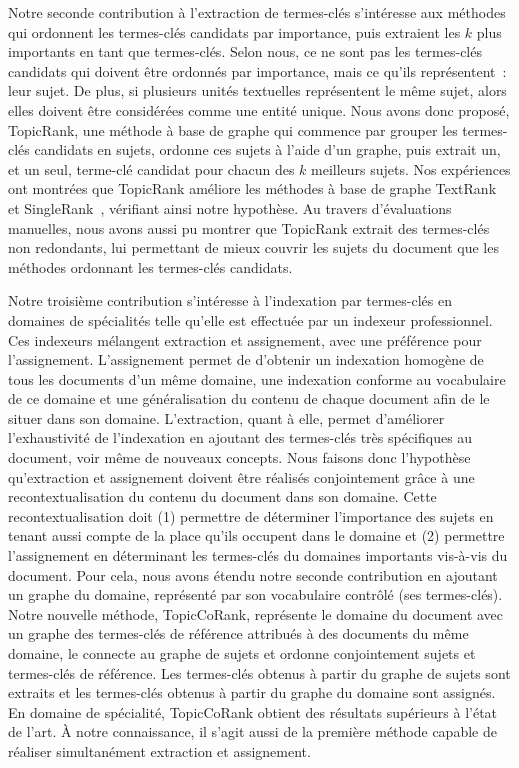     Notre seconde contribution à l'extraction de termes-clés s'intéresse aux
    méthodes qui ordonnent les termes-clés candidats par importance, puis
    extraient les $k$ plus importants en tant que termes-clés. Selon nous, ce ne
    sont pas les termes-clés candidats qui doivent être ordonnés par importance,
    mais ce qu'ils représentent~: leur sujet. De plus, si plusieurs unités
    textuelles représentent le même sujet, alors elles doivent être considérées
    comme une entité unique. Nous avons donc proposé, TopicRank, une méthode à
    base de graphe qui commence par grouper les termes-clés candidats en sujets,
    ordonne ces sujets à l'aide d'un graphe, puis extrait un, et un seul,
    terme-clé candidat pour chacun des $k$ meilleurs sujets. Nos expériences
    ont montrées que TopicRank améliore les méthodes à base de graphe
    TextRank~\cite{mihalcea2004textrank} et SingleRank~\cite{wan2008expandrank},
    vérifiant ainsi notre hypothèse. Au travers d'évaluations manuelles, nous
    avons aussi pu montrer que TopicRank extrait des termes-clés non redondants,
    lui permettant de mieux couvrir les sujets du document que les méthodes
    ordonnant les termes-clés candidats.

    Notre troisième contribution s'intéresse à l'indexation par termes-clés en
    domaines de spécialités telle qu'elle est effectuée par un indexeur
    professionnel. Ces indexeurs mélangent extraction et assignement, avec une
    préférence pour l'assignement. L'assignement permet de d'obtenir un
    indexation homogène de tous les documents d'un même domaine, une indexation
    conforme au vocabulaire de ce domaine et une généralisation du contenu de
    chaque document afin de le situer dans son domaine. L'extraction, quant à
    elle, permet d'améliorer l'exhaustivité de l'indexation en ajoutant des
    termes-clés très spécifiques au document, voir même de nouveaux concepts.
    Nous faisons donc l'hypothèse qu'extraction et assignement doivent être
    réalisés conjointement grâce à une recontextualisation du contenu du
    document dans son domaine. Cette recontextualisation doit (1) permettre de
    déterminer l'importance des sujets en tenant aussi compte de la place qu'ils
    occupent dans le domaine et (2) permettre l'assignement en déterminant les
    termes-clés du domaines importants vis-à-vis du document.
    Pour cela, nous avons étendu notre seconde contribution en ajoutant un
    graphe du domaine, représenté par son vocabulaire contrôlé (ses
    termes-clés). Notre nouvelle méthode, TopicCoRank, représente le domaine du
    document avec un graphe des termes-clés de référence attribués à des
    documents du même domaine, le connecte au graphe de sujets et ordonne
    conjointement sujets et termes-clés de référence. Les termes-clés obtenus à
    partir du graphe de sujets sont extraits et les termes-clés obtenus à partir
    du graphe du domaine sont assignés. En domaine de spécialité, TopicCoRank
    obtient des résultats supérieurs à l'état de l'art. À notre connaissance, il
    s'agit aussi de la première méthode capable de réaliser simultanément
    extraction et assignement.

